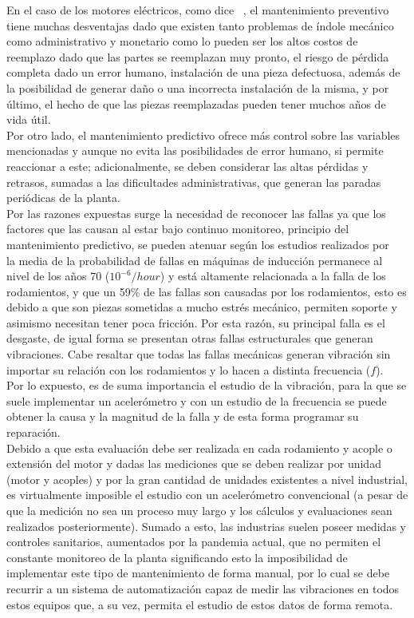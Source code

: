 	En el caso de los motores eléctricos, como dice ~\textcite{Lacey}, el mantenimiento preventivo tiene muchas desventajas dado que existen tanto problemas de índole mecánico como administrativo y monetario como lo pueden ser los altos costos de reemplazo dado que las partes se reemplazan muy pronto, el riesgo de pérdida completa dado un error humano, instalación de una pieza defectuosa, además de la posibilidad de generar daño o una incorrecta instalación de la misma, y por último, el hecho de que las piezas reemplazadas pueden tener muchos años de vida útil.\\
	
	
	Por otro lado, el mantenimiento predictivo ofrece más control sobre las variables mencionadas y aunque no evita las posibilidades de error humano, si permite reaccionar a este; adicionalmente, se deben considerar las altas pérdidas y retrasos, sumadas a las dificultades administrativas, que generan las paradas periódicas de la planta.\\



	Por las razones expuestas surge la necesidad de reconocer las fallas ya que los factores que las causan al estar bajo continuo monitoreo, principio del mantenimiento predictivo, se pueden atenuar según los estudios realizados por ~\textcite{Kammermann} la media de la probabilidad de fallas en máquinas de inducción permanece al nivel de los años 70 ($10^{-6}/hour$) y está altamente relacionada a la falla de los rodamientos, y que un 59\% de las fallas son causadas por los rodamientos, esto es debido a que son piezas sometidas a mucho estrés mecánico, permiten soporte y asimismo necesitan tener poca fricción. Por esta razón, su principal falla es el desgaste, de igual forma se presentan otras fallas estructurales que generan vibraciones. Cabe resaltar que todas las fallas mecánicas generan vibración sin importar su relación con los rodamientos y lo hacen a distinta frecuencia ($f$). \\


	Por lo expuesto, es de suma importancia el estudio de la vibración, para la que se suele implementar un acelerómetro y con un estudio de la frecuencia se puede obtener la causa y la magnitud de la falla y de esta forma programar su reparación.\\

	
	Debido a que esta evaluación debe ser realizada en cada rodamiento y acople o extensión del motor   y dadas las mediciones que se deben realizar por unidad (motor y acoples) y por la gran cantidad de unidades existentes a nivel industrial, es virtualmente imposible el estudio con un acelerómetro convencional (a pesar de que la medición no sea un proceso muy largo y los cálculos y evaluaciones sean realizados posteriormente). Sumado a esto, las industrias suelen poseer medidas y controles sanitarios, aumentados por la pandemia actual, que no permiten el constante monitoreo de la planta significando esto la imposibilidad de implementar este tipo de mantenimiento de forma manual, por lo cual se debe recurrir a un sistema de automatización capaz de medir las vibraciones en todos estos equipos que, a su vez, permita el estudio de estos datos de forma remota. \\

	

